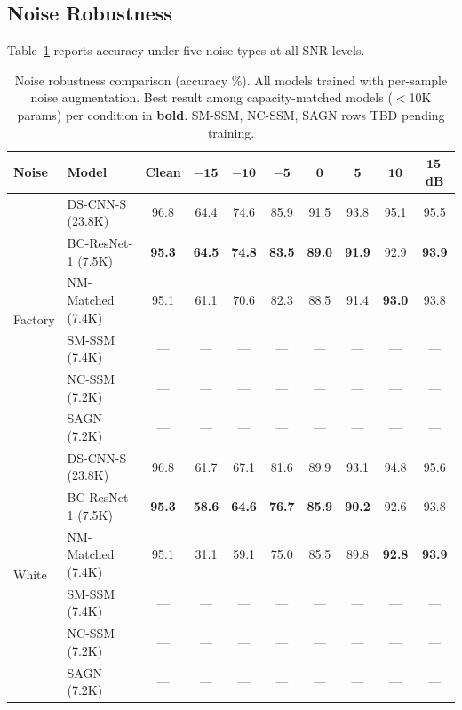 \documentclass[journal]{IEEEtran}
\begin{document}
\subsection{Noise Robustness}

Table~\ref{tab:noise_main} reports accuracy under five noise types at all SNR levels.

\begin{table}[t]
\centering
\caption{Noise robustness comparison (accuracy \%). All models trained with per-sample noise augmentation. Best result among capacity-matched models ($<$10K params) per condition in \textbf{bold}. SM-SSM, NC-SSM, SAGN rows TBD pending training.}
\label{tab:noise_main}
\small
\begin{tabular}{ll|cccccccc}
\toprule
\textbf{Noise} & \textbf{Model} & \textbf{Clean} & $\mathbf{-15}$ & $\mathbf{-10}$ & $\mathbf{-5}$ & $\mathbf{0}$ & $\mathbf{5}$ & $\mathbf{10}$ & $\mathbf{15}$\,\textbf{dB} \\
\midrule
\multirow{6}{*}{Factory}
  & DS-CNN-S (23.8K)    & 96.8 & 64.4 & 74.6 & 85.9 & 91.5 & 93.8 & 95.1 & 95.5 \\
  & BC-ResNet-1 (7.5K)  & \textbf{95.3} & \textbf{64.5} & \textbf{74.8} & \textbf{83.5} & \textbf{89.0} & \textbf{91.9} & 92.9 & \textbf{93.9} \\
  & NM-Matched (7.4K)   & 95.1 & 61.1 & 70.6 & 82.3 & 88.5 & 91.4 & \textbf{93.0} & 93.8 \\
  & SM-SSM (7.4K)       & --- & --- & --- & --- & --- & --- & --- & --- \\
  & NC-SSM (7.2K)       & --- & --- & --- & --- & --- & --- & --- & --- \\
  & SAGN (7.2K)         & --- & --- & --- & --- & --- & --- & --- & --- \\
\midrule
\multirow{6}{*}{White}
  & DS-CNN-S (23.8K)    & 96.8 & 61.7 & 67.1 & 81.6 & 89.9 & 93.1 & 94.8 & 95.6 \\
  & BC-ResNet-1 (7.5K)  & \textbf{95.3} & \textbf{58.6} & \textbf{64.6} & \textbf{76.7} & \textbf{85.9} & \textbf{90.2} & 92.6 & 93.8 \\
  & NM-Matched (7.4K)   & 95.1 & 31.1 & 59.1 & 75.0 & 85.5 & 89.8 & \textbf{92.8} & \textbf{93.9} \\
  & SM-SSM (7.4K)       & --- & --- & --- & --- & --- & --- & --- & --- \\
  & NC-SSM (7.2K)       & --- & --- & --- & --- & --- & --- & --- & --- \\
  & SAGN (7.2K)         & --- & --- & --- & --- & --- & --- & --- & --- \\

\end{tabular}
\end{table}
\end{document}

